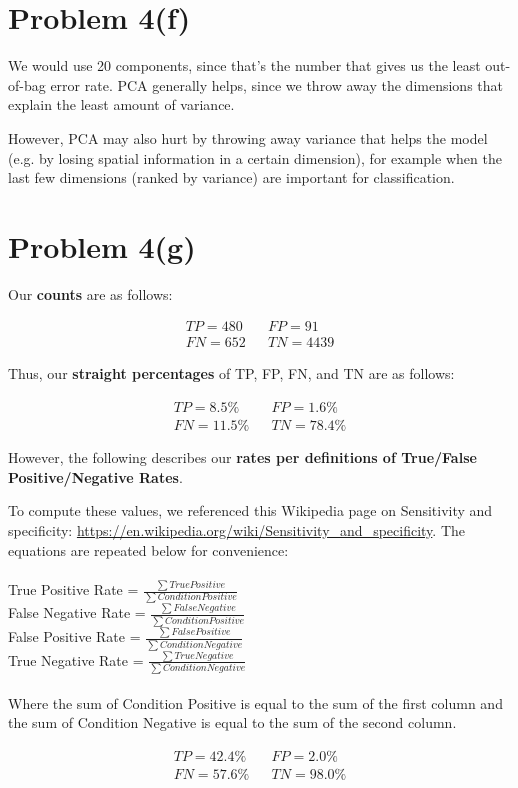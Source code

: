 \documentclass{article}
\begin{document}
\section*{Problem 4(f)}

We would use 20 components, since that's the number that gives us the least out-of-bag error rate. PCA generally helps, since we throw away the dimensions that explain the least amount of variance.

However, PCA may also hurt by throwing away variance that helps the model (e.g. by losing spatial information in a certain dimension), for example when the last few dimensions (ranked by variance) are important for classification.


\section*{Problem 4(g)}



Our \textbf{counts} are as follows:

\[
\begin{array}{ccc}
TP = 480 && FP =  91\\
FN = 652 && TN = 4439
\end{array}
\]

Thus, our \textbf{straight percentages} of TP, FP, FN, and TN are as follows:

\[
\begin{array}{ccc}
TP = 8.5\% && FP =  1.6\%\\
FN = 11.5\% && TN = 78.4\%
\end{array}
\]


However, the following describes our \textbf{rates per definitions of True/False Positive/Negative Rates}.

To compute these values, we referenced this Wikipedia page on Sensitivity and specificity: \url{https://en.wikipedia.org/wiki/Sensitivity_and_specificity}. The equations are repeated below for convenience:\\\\
True Positive Rate = $\frac{\sum True Positive}{\sum Condition Positive}$\\
False Negative Rate = $\frac{\sum False Negative}{\sum Condition Positive}$\\
False Positive Rate = $\frac{\sum False Positive}{\sum Condition Negative}$\\
True Negative Rate = $\frac{\sum True Negative}{\sum Condition Negative}$\\\\
Where the sum of Condition Positive is equal to the sum of the first column and the sum of Condition Negative is equal to the sum of the second column.

\[
\begin{array}{ccc}
TP = 42.4\% && FP =  2.0\%\\
FN = 57.6\% && TN = 98.0\%
\end{array}
\]
\end{document}
